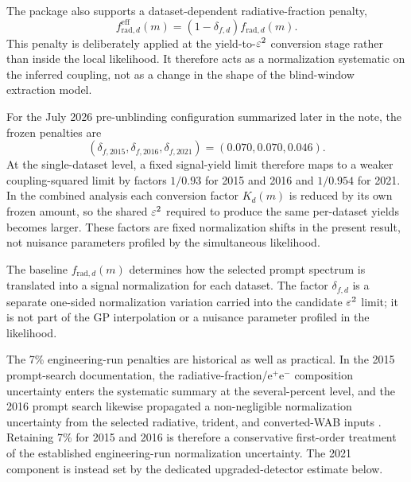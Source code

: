 The package also supports a dataset-dependent radiative-fraction penalty,
\begin{equation}
f_{\mathrm{rad},d}^{\mathrm{eff}}(m)
= \left(1-\delta_{f,d}\right) f_{\mathrm{rad},d}(m).
\label{eq:frad-penalty}
\end{equation}
This penalty is deliberately applied at the yield-to-$\varepsilon^2$ conversion stage rather
than inside the local likelihood. It therefore acts as a normalization systematic on
the inferred coupling, not as a change in the shape of the blind-window extraction
model.

For the July 2026 pre-unblinding configuration summarized later in the note, the frozen
penalties are
\begin{equation}
(\delta_{f,2015},\delta_{f,2016},\delta_{f,2021})=(0.070,0.070,0.046).
\label{eq:frad-penalty-vector}
\end{equation}
At the single-dataset level, a fixed signal-yield limit therefore maps to a weaker
coupling-squared limit by factors $1/0.93$ for 2015 and 2016 and $1/0.954$ for 2021.
In the combined analysis each conversion factor $K_d(m)$ is reduced by its own frozen
amount, so the shared $\varepsilon^2$ required to produce the same per-dataset yields becomes
larger. These factors are fixed normalization shifts in the present result, not nuisance
parameters profiled by the simultaneous likelihood.

The baseline $f_{\mathrm{rad},d}(m)$ determines how the selected prompt spectrum is
translated into a signal normalization for each dataset. The factor $\delta_{f,d}$ is a
separate one-sided normalization variation carried into the candidate $\varepsilon^2$ limit;
it is not part of the GP interpolation or a nuisance parameter profiled in the
likelihood.

The 7\% engineering-run penalties are historical as well as practical. In the 2015
prompt-search documentation, the radiative-fraction/e$^+$e$^-$
composition uncertainty enters the systematic summary at the several-percent level, and
the 2016 prompt search likewise propagated a non-negligible normalization uncertainty
from the selected radiative, trident, and converted-WAB inputs
\cite{HPS2015InternalNote,HPS2016PromptLong}. Retaining 7\% for 2015 and 2016 is
therefore a conservative first-order treatment of the established engineering-run
normalization uncertainty. The 2021 component is instead set by the dedicated
upgraded-detector estimate below.

